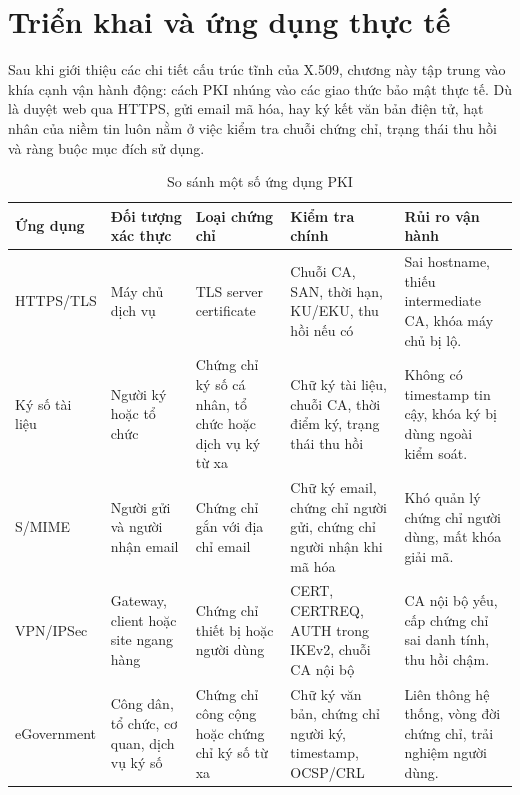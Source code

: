 \chapter{Triển khai và ứng dụng thực tế}
\label{chap:deploy}

Sau khi giới thiệu các chi tiết cấu trúc tĩnh của X.509, chương này tập trung vào khía cạnh vận hành động: cách PKI nhúng vào các giao thức bảo mật thực tế. Dù là duyệt web qua HTTPS, gửi email mã hóa, hay ký kết văn bản điện tử, hạt nhân của niềm tin luôn nằm ở việc kiểm tra chuỗi chứng chỉ, trạng thái thu hồi và ràng buộc mục đích sử dụng.

\begin{table}[ht]
    \centering
    \caption{So sánh một số ứng dụng PKI}
    \label{tab:pki-applications}
    \scriptsize
    \begin{tabularx}{\textwidth}{@{} >{\raggedright\arraybackslash}p{}
        >{\raggedright\arraybackslash}p{}
        >{\raggedright\arraybackslash}p{}
        X X @{}}
        \toprule
        \textbf{Ứng dụng} & \textbf{Đối tượng xác thực}
            & \textbf{Loại chứng chỉ} & \textbf{Kiểm tra chính}
            & \textbf{Rủi ro vận hành} \\
        \midrule
        HTTPS/TLS
            & Máy chủ dịch vụ
            & TLS server certificate
            & Chuỗi CA, SAN, thời hạn, KU/EKU, thu hồi nếu có
            & Sai hostname, thiếu intermediate CA, khóa máy chủ bị lộ. \\
        Ký số tài liệu
            & Người ký hoặc tổ chức
            & Chứng chỉ ký số cá nhân, tổ chức hoặc dịch vụ ký từ xa
            & Chữ ký tài liệu, chuỗi CA, thời điểm ký, trạng thái thu hồi
            & Không có timestamp tin cậy, khóa ký bị dùng ngoài kiểm soát. \\
        S/MIME
            & Người gửi và người nhận email
            & Chứng chỉ gắn với địa chỉ email
            & Chữ ký email, chứng chỉ người gửi, chứng chỉ người nhận khi mã hóa
            & Khó quản lý chứng chỉ người dùng, mất khóa giải mã. \\
        VPN/IPSec
            & Gateway, client hoặc site ngang hàng
            & Chứng chỉ thiết bị hoặc người dùng
            & CERT, CERTREQ, AUTH trong IKEv2, chuỗi CA nội bộ
            & CA nội bộ yếu, cấp chứng chỉ sai danh tính, thu hồi chậm. \\
        eGovernment
            & Công dân, tổ chức, cơ quan, dịch vụ ký số
            & Chứng chỉ công cộng hoặc chứng chỉ ký số từ xa
            & Chữ ký văn bản, chứng chỉ người ký, timestamp, OCSP/CRL
            & Liên thông hệ thống, vòng đời chứng chỉ, trải nghiệm người dùng. \\
        \bottomrule
    \end{tabularx}
\end{table}

